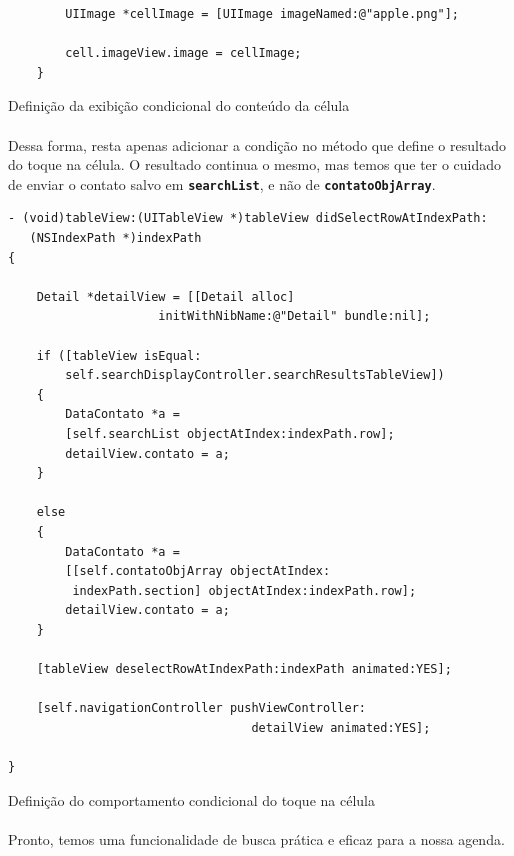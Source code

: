 \documentclass[a4paper,12pt,brazil,doubleside]{book}
\begin{document}
\begin{singlespace}
\begin{listing}[H]
\begin{verbatim}
        UIImage *cellImage = [UIImage imageNamed:@"apple.png"];
        
        cell.imageView.image = cellImage;
    }
\end{verbatim}
\caption{Definição da exibição condicional do conteúdo da célula}
\end{listing}

\paragraph{}Dessa forma, resta apenas adicionar a condição no método que define o resultado do toque na célula. O resultado continua o mesmo, mas temos que ter o cuidado de enviar o contato salvo em \texttt{\textbf{searchList}}, e não de \texttt{\textbf{contatoObjArray}}.

\begin{listing}[H]
\begin{verbatim}
- (void)tableView:(UITableView *)tableView didSelectRowAtIndexPath:
   (NSIndexPath *)indexPath
{

    Detail *detailView = [[Detail alloc]
                     initWithNibName:@"Detail" bundle:nil];
    
    if ([tableView isEqual:
        self.searchDisplayController.searchResultsTableView])
    {
        DataContato *a =
        [self.searchList objectAtIndex:indexPath.row];
        detailView.contato = a;
    }

    else
    {
        DataContato *a =
        [[self.contatoObjArray objectAtIndex:
         indexPath.section] objectAtIndex:indexPath.row];
        detailView.contato = a;
    }
    
    [tableView deselectRowAtIndexPath:indexPath animated:YES];
    
    [self.navigationController pushViewController:
                                  detailView animated:YES];
    
}
\end{verbatim}
\caption{Definição do comportamento condicional do toque na célula}
\end{listing}

\paragraph{}Pronto, temos uma funcionalidade de busca prática e eficaz para a nossa agenda.

\begin{framed}

\end{framed}
\end{singlespace}
\end{document}
